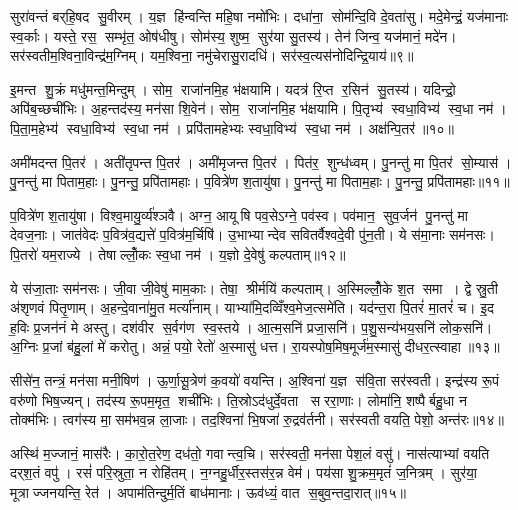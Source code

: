 सुरा॑वन्तं बर्‌हि॒षद सु॒वीरम्। य॒ज्ञ हि॑न्वन्ति महि॒षा नमो॑भिः। दधा॑ना॒ सोम॑न्दि॒वि दे॒वता॑सु। मदे॒मेन्द्रं॒ यज॑मानाः स्व॒र्काः। यस्ते॒ रस॒ सम्भृ॑त॒ ओष॑धीषु। सोम॑स्य॒ शुष्म॒ सुर॑या सु॒तस्य॑। तेन॑ जिन्व॒ यज॑मानं॒ मदे॑न। सर॑स्वतीम॒श्विना॒विन्द्र॑म॒ग्निम्। यम॒श्विना॒ नमु॑चेरासु॒रादधि॑। सर॑स्व॒त्यस॑नोदिन्द्रि॒याय॑॥९॥

इ॒मन्त शु॒क्रं मधु॑मन्त॒मिन्दुम्। सोम॒ राजा॑नमि॒ह भ॑क्षयामि। यदत्र॑ रि॒प्त र॒सिन॑ सु॒तस्य॑। यदिन्द्रो॒ अपि॑ब॒च्छची॑भिः। अ॒हन्तद॑स्य॒ मन॑सा शि॒वेन॑। सोम॒ राजा॑नमि॒ह भ॑क्षयामि। पि॒तृभ्य॑ स्वधा॒विभ्य॑ स्व॒धा नम॑। पि॒ता॒म॒हेभ्य॑ स्वधा॒विभ्य॑ स्व॒धा नम॑। प्रपि॑तामहेभ्यः स्वधा॒विभ्य॑ स्व॒धा नम॑। अक्ष॑न्पि॒तर॑॥१०॥

अमी॑मदन्त पि॒तर॑। अती॑तृपन्त पि॒तर॑। अमी॑मृजन्त पि॒तर॑। पित॑र॒ शुन्ध॑ध्वम्। पु॒नन्तु॑ मा पि॒तर॑ सो॒म्यास॑। पु॒नन्तु॑ मा पिताम॒हाः। पु॒नन्तु॒ प्रपि॑तामहाः। प॒वित्रे॑ण श॒तायु॑षा। पु॒नन्तु॑ मा पिताम॒हाः। पु॒नन्तु॒ प्रपि॑तामहाः॥११॥

प॒वित्रे॑ण श॒तायु॑षा। विश्व॒मायु॒र्व्य॑श्ञवै। अग्न॒ आयूषि पव॒सेऽग्ने॒ पव॑स्व। पव॑मान॒ सुव॒र्जन॑ पु॒नन्तु॑ मा देवज॒नाः। जात॑वेदः प॒वित्र॑व॒द्यत्ते॑ प॒वित्र॑म॒र्चिषि॑। उ॒भाभ्यान्देव सवितर्वैश्वदे॒वी पु॑न॒ती। ये स॑मा॒नाः सम॑नसः। पि॒तरो॑ यम॒राज्ये। तेषाल्लोँ॒कः स्व॒धा नम॑। य॒ज्ञो दे॒वेषु॑ कल्पताम्॥१२॥

ये स॑जा॒ताः सम॑नसः। जी॒वा जी॒वेषु॑ माम॒काः। तेषा॒ श्रीर्मयि॑ कल्पताम्। अ॒स्मिल्लोँ॒के श॒त समा। द्वे स्रु॒ती अ॑शृणवं पितृ॒णाम्। अ॒हन्दे॒वाना॑मु॒त मर्त्या॑नाम्। याभ्या॑मि॒दव्विँश्व॒मेज॒त्समे॑ति। यद॑न्त॒रा पि॒तरं॑ मा॒तरं॑ च। इ॒द ह॒विः प्र॒जन॑नं मे अस्तु। दश॑वीर स॒र्वग॑ण स्व॒स्तये। आ॒त्म॒सनि॑ प्रजा॒सनि॑। प॒शु॒सन्य॑भय॒सनि॑ लोक॒सनि॑। अ॒ग्निः प्र॒जां ब॑हु॒लां मे॑ करोतु। अन्नं॒ पयो॒ रेतो॑ अ॒स्मासु॑ धत्त। रा॒यस्पोष॒मिष॒मूर्ज॑म॒स्मासु॑ दीधर॒त्स्वाहा॥१३॥\anuvakamend[इ॒न्द्रि॒याय॑ पि॒तर॑ श॒तायु॑षा पु॒नन्तु॑ मा पिताम॒हाः पु॒नन्तु॒ प्रपि॑तामहाः कल्पता स्व॒स्तये॒ पञ्च॑ च]

सीसे॑न॒ तन्त्रं॒ मन॑सा मनी॒षिण॑। ऊ॒र्णा॒सू॒त्रेण॑ क॒वयो॑ वयन्ति। अ॒श्विना॑ य॒ज्ञ स॑वि॒ता सर॑स्वती। इन्द्र॑स्य रू॒पं वरु॑णो भिष॒ज्यन्। तद॑स्य रू॒पम॒मृत॒ शची॑भिः। ति॒स्रोऽद॑धुर्दे॒वता सररा॒णाः। लोमा॑नि॒ शष्पैर्बहु॒धा न तोक्म॑भिः। त्वग॑स्य मा॒सम॑भव॒न्न ला॒जाः। तद॒श्विना॑ भि॒षजा॑ रु॒द्रव॑र्तनी। सर॑स्वती वयति॒ पेशो॒ अन्त॑रः॥१४॥

अस्थि॑ म॒ज्जानं॒ मास॑रैः। का॒रो॒त॒रेण॒ दध॑तो॒ गवान्त्व॒चि। सर॑स्वती॒ मन॑सा पेश॒लं वसु॑। नास॑त्याभ्यां वयति दर्‌श॒तं वपु॑। रसं॑ परि॒स्रुता॒ न रोहि॑तम्। न॒ग्नहु॒र्धीर॒स्तस॑र॒न्न वेम॑। पय॑सा शु॒क्रम॒मृतं॑ ज॒नित्रम्। सुर॑या॒ मूत्राज्जनयन्ति॒ रेत॑। अपाम॑तिन्दुर्म॒तिं बाध॑मानाः। ऊव॑ध्यं॒ वात स॒बुव॒न्तदा॒रात्॥१५॥

